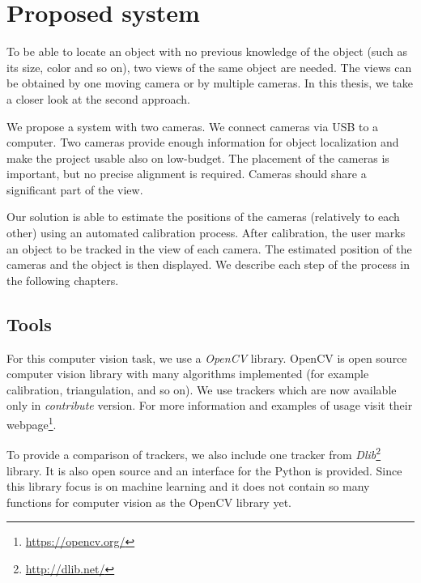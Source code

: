 \chapter{Proposed system}

To be able to locate an object with no previous knowledge of the object (such
as its size, color and so on), two views of the same object are needed. The
views can be obtained by one moving camera or by multiple cameras. In this
thesis, we take a closer look at the second approach.

We propose a system with two cameras. We connect cameras via USB to a computer.
Two cameras provide enough information for object localization and make the
project usable also on low-budget. The placement of the cameras is important,
but no precise alignment is required. Cameras should share a significant part
of the view.


Our solution is able to estimate the positions of the cameras (relatively to
each other) using an automated calibration process. After calibration, the user
marks an object to be tracked in the view of each camera. The estimated
position of the cameras and the object is then displayed. We describe each step
of the process in the following chapters.

\section{Tools}

For this computer vision task, we use a \emph{OpenCV} library. OpenCV is open
source computer vision library with many algorithms implemented (for example
calibration, triangulation, and so on). We use trackers which are now available
only in \emph{contribute} version. For more information and examples of usage
visit their webpage\footnote{\url{https://opencv.org/}}.

To provide a comparison of trackers, we also include one tracker from
\emph{Dlib}\footnote{\url{http://dlib.net/}} library. It is also open source
and an interface for the Python is provided.  Since this library focus is on
machine learning and it does not contain so many functions for computer vision
as the OpenCV library yet.
